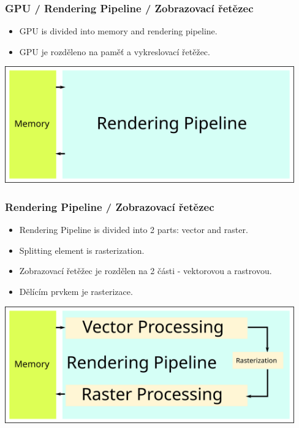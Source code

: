 
\begin{frame}
\frametitle{GPU / Rendering Pipeline / Zobrazovací řetězec}
  \scriptsize
	\begin{itemize}
		\item GPU is divided into memory and rendering pipeline.
	\end{itemize}
	\begin{itemize}
		\item GPU je rozděleno na paměť a vykreslovací řetěžec.
	\end{itemize}
	\includegraphics[width=12.5cm,keepaspectratio]{pics/pipeline/RenderingPipelineMemoryPipeline}
\end{frame}

\begin{frame}
\frametitle{Rendering Pipeline / Zobrazovací řetězec}
  \scriptsize
	\begin{itemize}
		\item Rendering Pipeline is divided into 2 parts: vector and raster.
    \item Splitting element is rasterization.
	\end{itemize}
	\begin{itemize}
		\item Zobrazovací řetěžec je rozdělen na 2 části - vektorovou a rastrovou.
    \item Dělícím prvkem je rasterizace.
	\end{itemize}
	\includegraphics[width=12.5cm,keepaspectratio]{pics/pipeline/RenderingPipelineVectorRaster}
\end{frame}

